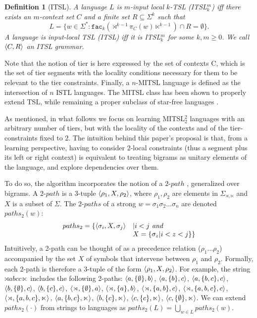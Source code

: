 \documentclass[11pt,a4paper]{article}
\newcommand{\facn}[1]{\ensuremath{\texttt{fac}_{#1}}}
\newtheorem{definition}{Definition}
\begin{document}
\begin{definition}[ITSL]
A language $L$ is \emph{$m$-input local $k$-TSL} (ITSL$^m_k$) iff there exists an $m$-context set $C$ and a finite set $R \subseteq \Sigma^k$ such that
\[
L = \{ w \in \Sigma^*: \facn{k}(\rtimes^{k-1} \pi_C(w) \ltimes^{k-1})  \cap R = \emptyset \}.
\]
A language is \emph{input-local TSL} (ITSL) iff it is ITSL$^m_k$ for some $k, m \geq 0$.
We call $\left \langle C, R \right \rangle $ an ITSL grammar.
\label{dfn:ITSL}
\end{definition}

Note that the notion of tier is here expressed by the set of contexts C, which is the set of tier segments with the locality conditions necessary for them to be relevant to the tier constraints.\@
Finally, a $n$-MITSL language is defined as the intersection of $n$ ISTL languages.\@
The MITSL class has been shown to properly extend TSL, while remaining a proper subclass of star-free languages \cite{desanto2019structure}.

As mentioned, in what follows we focus on learning MITSL$^2_2$ languages with an arbitrary number of tiers, but with the locality of the contexts and of the tier-constraints fixed to $2$.
The intuition behind this paper's proposal is that, from a learning perspective, having to consider $2$-local constraints (thus a segment plus its left or right context) is equivalent to treating bigrams as unitary elements of the language, and explore dependencies over them.

To do so, the algorithm incorporates the notion of a $2\text{-}path$ \citep{JardineHeinz16}, generalized over bigrams.
A $2\text{-}path$ is a $3$-tuple $\langle{\rho_1, X, \rho_2}\rangle$, where $\rho_1, \rho_2$  are elements in $\Sigma_{\rtimes,\ltimes}$ and $X$ is a subset of $\Sigma$.
The $2\text{-}paths$ of a strong $w = \sigma_1\sigma_2\dots\sigma_n$ are denoted $paths_2(w)$:
$$
  \begin{array}{ll}
  paths_2= \{ \langle{\sigma_i,X,\sigma_j}\rangle & |  i < j  \textit{ and}\\
   & X = \{ \sigma_z | i < z<j\} \}
    \end{array}
$$
Intuitively, a 2-path can be thought of as a precedence relation ($\rho_1\ldots{}\rho_2$) accompanied by the set $X$ of symbols that intervene between $\rho_1$ and $\rho_2$.\@
 Formally, each 2-path is therefore a 3-tuple of the form $\langle{\rho_1, X, \rho_2}\rangle$.\@
 For example, the string $\rtimes abcc\ltimes$ includes the following 2-paths: 
$\langle{a, \{\emptyset\}, b}\rangle$, $\langle{a, \{b\}, c}\rangle$, $\langle{a, \{b,c\}, c}\rangle$, $\langle{b, \{\emptyset\}, c}\rangle$, $\langle{b, \{c\}, c}\rangle$, $\langle{\rtimes, \{\emptyset\}, a}\rangle$, $\langle{\rtimes, \{a\}, b}\rangle$,  $\langle{\rtimes, \{a,b\}, c}\rangle$, $ \langle{\rtimes,\{a,b,c\},c}\rangle$, $ \langle{\rtimes,\{a,b,c\},\ltimes}\rangle$, $\langle{a, \{b,c\}, \ltimes}\rangle$, $ \langle{b, \{c\}, \ltimes}\rangle$, $\langle{c, \{c\}, \ltimes}\rangle$, $ \langle{c, \{\emptyset\}, \ltimes}\rangle$.\@
We can extend  $paths_2(\cdot)$ from strings to languages as $paths_2(L) = \bigcup_{w \in L} paths_2(w)$.
\end{document}

